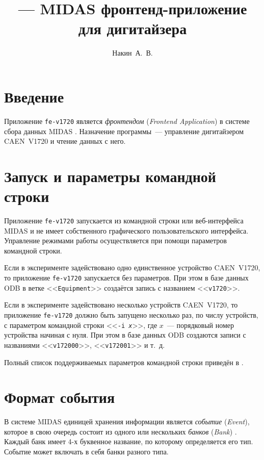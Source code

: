 \documentclass[12pt, a4paper]{article}
\title{\APP{} --- MIDAS фронтенд-приложение для дигитайзера \DEVICE{}}
\author{Накин~А.~В.}
\newcommand{\APP}{{\tt fe-v1720}}
\newcommand{\DEVICE}{CAEN~V1720}
\newcommand{\TERM}[1]{{\it #1}}
\newcommand{\ODBNODE}[1]{<<{\tt #1}>>}
\begin{document}
\maketitle

\section{Введение}

Приложение \APP{} является \TERM{фронтендом} (\TERM{Frontend Application}) \cite{MidasWikiFrontend} в системе сбора данных MIDAS \cite{MidasWiki}. Назначение программы~--- управление дигитайзером \DEVICE{} и чтение данных с него.

\section{Запуск и параметры командной строки}

Приложение \APP{} запускается из командной строки или веб-интерфейса MIDAS \cite{MidasWikiMhttpd} и не имеет собственного графического пользовательского интерфейса. Управление режимами работы осуществляется при помощи параметров командной строки.

Если в эксперименте задействовано одно единственное устройство \DEVICE{}, то приложение \APP{} запускается без параметров. При этом в базе данных ODB в ветке \ODBNODE{Equipment} \cite{MidasWikiEquipment} создаётся запись с названием \ODBNODE{v1720}.

Если в эксперименте задействовано несколько устройств \DEVICE{}, то приложение \APP{} должно быть запущено несколько раз, по числу устройств, с параметром командной строки <<{\tt -i {\it x}}>>, где $x$~--- порядковый номер устройства начиная с нуля. При этом в базе данных ODB создаются записи с названиями \ODBNODE{v172000}, \ODBNODE{v172001} и т.~д.

Полный список поддерживаемых параметров командной строки приведён в \cite{MidasWikiFrontend}. 

\section{Формат события}

В системе MIDAS единицей хранения информации является \TERM{событие} (\TERM{Event}), которое в свою очередь состоит из одного или нескольких \TERM{банков} (\TERM{Bank}) \cite{MidasWikiEvent}. Каждый банк имеет 4-х буквенное название, по которому определяется его тип. Событие может включать в себя банки разного типа.
\end{document}

